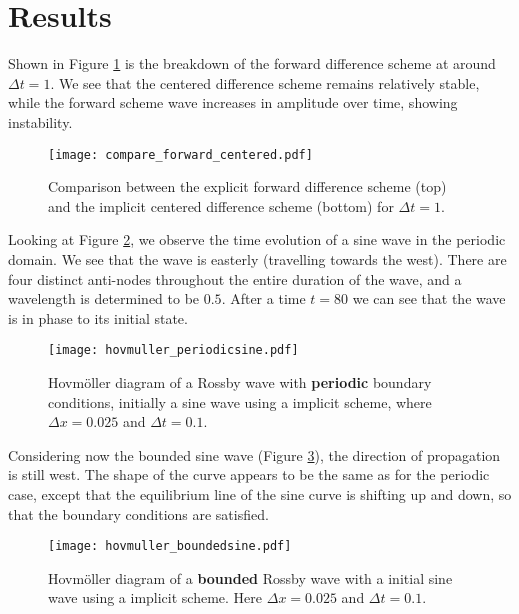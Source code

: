 \section{Results}
\label{sec:results}

Shown in Figure \ref{fig:compare} is the breakdown of the forward difference scheme at around $\Delta t = 1$. We see that the centered difference scheme remains relatively stable, while the forward scheme wave increases in amplitude over time, showing instability.
\begin{figure}[htbp]
	\centering
	\texttt{[image: compare\_forward\_centered.pdf]}
	\caption{Comparison between the explicit forward difference scheme (top) and the implicit centered difference scheme (bottom) for $\Delta t = 1$.}
	\label{fig:compare}
\end{figure}

Looking at Figure \ref{fig:hovmollerSinePeriodic}, we observe the time evolution of a sine wave in the periodic domain. We see that the wave is easterly (travelling towards the west). There are four distinct anti-nodes throughout the entire duration of the wave, and a wavelength is determined to be $0.5$. After a time $t=80$ we can see that the wave is in phase to its initial state.
\begin{figure}[htbp]
	\centering
	\texttt{[image: hovmuller\_periodicsine.pdf]}
	\caption{Hovmöller diagram of a Rossby wave with \textbf{periodic} boundary conditions, initially a sine wave using a implicit scheme, where $\Delta x = 0.025$ and $\Delta t = 0.1$.}
	\label{fig:hovmollerSinePeriodic}
\end{figure}

Considering now the bounded sine wave (Figure \ref{fig:hovmollerSineBounded}), the direction of propagation is still west. The shape of the curve appears to be the same as for the periodic case, except that the equilibrium line of the sine curve is shifting up and down, so that the boundary conditions are satisfied.
\begin{figure}[htbp]
	\centering
	\texttt{[image: hovmuller\_boundedsine.pdf]}
	\caption{Hovmöller diagram of a \textbf{bounded} Rossby wave with a initial sine wave using a implicit scheme. Here $\Delta x = 0.025$ and $\Delta t = 0.1$.}
	\label{fig:hovmollerSineBounded}
\end{figure}

